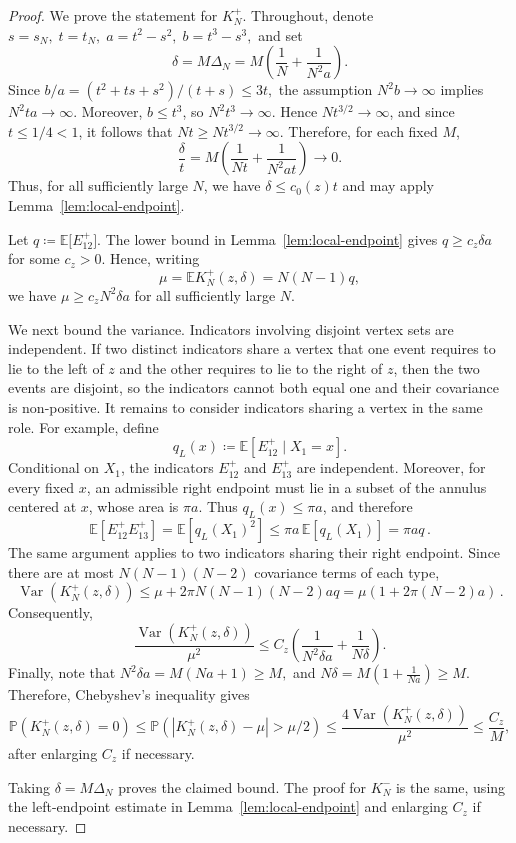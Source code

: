 \documentclass[10pt,a4paper]{amsart}
\newcommand{\EE}{\mathbb E}
\newcommand{\PP}{\mathbb P}
\newcommand{\Var}{\operatorname{Var}}
\begin{document}
\begin{proof}
We prove the statement for \(K_N^+\). Throughout, denote
\(
    s=s_N, \; 
    t=t_N, \;
    a=t^2-s^2, \;
    b=t^3-s^3,
\)
and set
\[
    \delta=M\Delta_N
    =
    M\left(
        \frac1N+\frac{1}{N^2a}
    \right).
\]
Since
\(
    b/a
    =
    {(t^2+ts+s^2)}/{(t+s)}
    \le 3t,
\)
the assumption \(N^2b\to\infty\) implies \(N^2ta\to\infty\).
Moreover, \(b\le t^3\), so \(N^2t^3\to\infty\). Hence
\(Nt^{3/2}\to\infty\), and since \(t\le1/4<1\), it follows that
\(Nt\ge Nt^{3/2}\to\infty\).
%
%
Therefore, for each fixed \(M\),
\[
    \frac{\delta}{t}
    =
    M\left(
        \frac{1}{Nt}
        +
        \frac{1}{N^2at}
    \right)
    \longrightarrow0.
\]
Thus, for all sufficiently large \(N\), we have
\(\delta\le c_0(z)t\) and may apply
Lemma~\ref{lem:local-endpoint}.

Let
\(
    q \coloneqq \EE \big[ E^+_{12} \big] .
\)
The lower bound in Lemma~\ref{lem:local-endpoint} gives
\(
    q\ge c_z\delta a
\)
for some \(c_z>0\). Hence, writing
\[
    \mu=\EE K_N^+(z,\delta)=N(N-1)q,
\]
we have
\(
    \mu\ge c_zN^2\delta a
\)
for all sufficiently large \(N\).

We next bound the variance. Indicators involving disjoint vertex sets are independent. 
If two distinct indicators share a vertex that one event requires to
lie to the left of \(z\) and the other requires to lie to the right of
\(z\), then the two events are disjoint, so the indicators cannot both equal one and their covariance is non-positive.
%
It remains to consider indicators sharing a vertex in the same role. For example, define
\[
    q_L(x) \coloneqq \EE\left[E^+_{12}\mid X_1=x\right].
\]
Conditional on \(X_1\), the indicators \(E^+_{12}\) and \(E^+_{13}\) are independent. Moreover, for every fixed \(x\), an admissible right endpoint must lie in a subset of the annulus centered at \(x\), whose area is \(\pi a\). Thus \(q_L(x)\le\pi a\), and therefore
\[
    \EE\left[E^+_{12}E^+_{13}\right]
    =
    \EE\left[q_L(X_1)^2\right] 
    \le
    \pi a\,\EE \left[ q_L(X_1) \right]
    =
    \pi a q \, .
\]
The same argument applies to two indicators sharing their right endpoint. Since there are at most \(N(N-1)(N-2)\) covariance terms of each type,
\[
    \Var\left(K_N^+(z,\delta)\right)
    \le
    \mu+2\pi N(N-1)(N-2)aq 
    =
    \mu\left(1+2\pi(N-2)a\right) \, .
\]
Consequently,
\[
    \frac{\Var(K_N^+(z,\delta))}{\mu^2}
    \le
    C_z\left(
        \frac{1}{N^2\delta a}
        +
        \frac{1}{N\delta}
    \right).
\]
Finally, note that
\(
    N^2\delta a=M(Na+1)\ge M,
\)
and
\(
    N\delta
    =
    M\left(1+\frac{1}{Na}\right)
    \ge M.
\)
Therefore, Chebyshev's inequality gives
\[
    \PP\left(K_N^+(z,\delta)=0\right)
    \le
    {
    \PP\left( |K_N^+(z,\delta)-\mu|>\mu/2 \right) 
    }
    \le 
    \frac{4\Var(K_N^+(z,\delta))}{\mu^2}
    \le
    \frac{C_z}{M},
\]
after enlarging \(C_z\) if necessary.


%
Taking
\(\delta=M\Delta_N\) proves the claimed bound. The proof for \(K_N^-\)
is the same, using the left-endpoint estimate in
Lemma~\ref{lem:local-endpoint} and enlarging \(C_z\) if necessary.
\end{proof}
\end{document}
